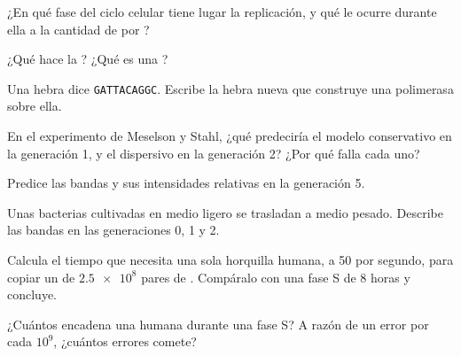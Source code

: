 \begin{exercise}[$\star$]\label{exo:g11:dna-replication:3}
¿En qué fase del ciclo celular tiene lugar la replicación, y qué le
ocurre durante ella a la cantidad de  por ?
\end{exercise}

\begin{exercise}[$\star$]\label{exo:g11:dna-replication:4}
¿Qué hace la ? ¿Qué es una ?
\end{exercise}

\begin{exercise}[$\star$]\label{exo:g11:dna-replication:5}
Una hebra dice \texttt{GATTACAGGC}. Escribe la hebra nueva que
construye una polimerasa sobre ella.
\end{exercise}

\begin{exercise}[$\star\star$]\label{exo:g11:dna-replication:6}
En el experimento de Meselson y Stahl, ¿qué predeciría el modelo
conservativo en la generación 1, y el dispersivo en la generación 2?
¿Por qué falla cada uno?
\end{exercise}

\begin{exercise}[$\star\star$]\label{exo:g11:dna-replication:7}
Predice las bandas y sus intensidades relativas en la generación 5.
\end{exercise}

\begin{exercise}[$\star\star$]\label{exo:g11:dna-replication:8}
Unas bacterias cultivadas en medio ligero se trasladan a medio pesado.
Describe las bandas en las generaciones 0, 1 y 2.
\end{exercise}

\begin{exercise}[$\star\star$]\label{exo:g11:dna-replication:9}
Calcula el tiempo que necesita una sola horquilla humana, a 50
 por segundo, para copiar un  de $\num{2.5e8}$
pares de . Compáralo con una fase S de 8 horas y concluye.
\end{exercise}

\begin{exercise}[$\star\star$]\label{exo:g11:dna-replication:10}
¿Cuántos  encadena una  humana durante una fase S? A
razón de un error por cada $10^9$, ¿cuántos errores comete?
\end{exercise}

